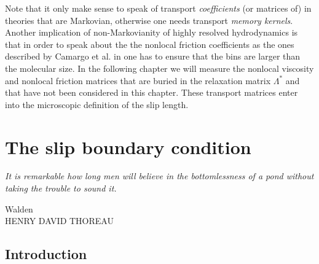 \documentclass[b5paper,openright,10pt]{book}
\begin{document}
Note   that   it    only   make   sense   to    speak   of   transport
\textit{coefficients} (or matrices of) in theories that are Markovian,
otherwise  one  needs   transport  \textit{memory  kernels}.   Another
implication of  non-Markovianity of  highly resolved  hydrodynamics is
that in order  to speak about the the  nonlocal friction coefficients
as the ones  described by Camargo et al. in \cite{CamargoBC2018} one  has to ensure
that the  bins are larger  than the  molecular size. In  the following chapter we will  measure  the nonlocal  viscosity and  nonlocal
friction matrices that are buried in the relaxation matrix $\Lambda^*$
and  that  have  not  been  considered in  this chapter.  These
transport matrices enter  into the microscopic definition  of the slip
length.


\chapter{The slip boundary condition}
\label{Chap:Slip}
\epigraph{\textit{It is remarkable how long men will believe in the bottomlessness of a pond without taking the trouble to sound it.}}{Walden \\ HENRY DAVID THOREAU}

\section{Introduction}
\end{document}
